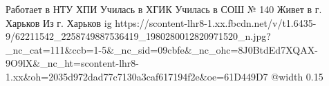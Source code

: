  
 
 
 
 

\par
Работает в НТУ ХПИ
Училась в ХГИК
Училась в СОШ № 140
Живет в г. Харьков
Из г. Харьков
\ifcmt
  ig https://scontent-lhr8-1.xx.fbcdn.net/v/t1.6435-9/62211542_2258749887536419_1980280012820971520_n.jpg?_nc_cat=111&ccb=1-5&_nc_sid=09cbfe&_nc_ohc=8J0BtdEd7XQAX-9O9lX&_nc_ht=scontent-lhr8-1.xx&oh=2035d972dad77c7130a3caf617194f2e&oe=61D449D7
  @width 0.15
\fi
